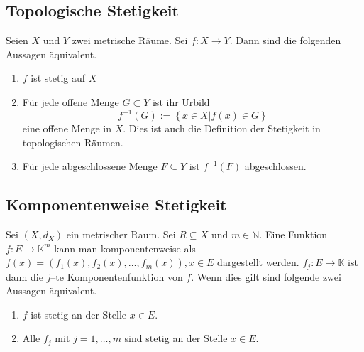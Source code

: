 \documentclass[a4paper,12pt]{article}
\begin{document}
\subsection{Topologische Stetigkeit}
Seien $X$ und $Y$ zwei metrische Räume. Sei $f:X\rightarrow Y$. Dann sind die folgenden Aussagen äquivalent.
\begin{enumerate}[label=\arabic*.]
        \item $f$ ist stetig auf $X$ 
        \item Für jede offene Menge $G\subset Y$ ist ihr Urbild
                \[ 
                        f^{-1}(G):=\left\{x \in X|f(x) \in G\right\}
                \] 
                eine offene Menge in $X$. Dies ist auch die Definition der Stetigkeit in topologischen Räumen.
        \item Für jede abgeschlossene Menge $F\subseteq Y$ ist $f^{-1}(F)$ abgeschlossen.
\end{enumerate}

\subsection{Komponentenweise Stetigkeit}
Sei $(X,d_X)$ ein metrischer Raum. Sei $R\subseteq X$ und $m \in \mathbb{N}$. Eine Funktion $f:E\rightarrow \mathbb{K}^m$ kann man komponentenweise als $f(x)=\left(f_1(x),f_2(x),\hdots ,f_m(x)\right),x \in E$ dargestellt werden. $f_j:E\rightarrow \mathbb{K}$ ist dann die $j$--te Komponentenfunktion von $f$. Wenn dies gilt sind folgende zwei Aussagen äquivalent.
\begin{enumerate}[label=\arabic*.]
        \item $f$ ist stetig an der Stelle $x \in E$.
        \item Alle $f_j$ mit $j=1,\hdots ,m$ sind stetig an der Stelle $x \in E$.
\end{enumerate}
\end{document}
